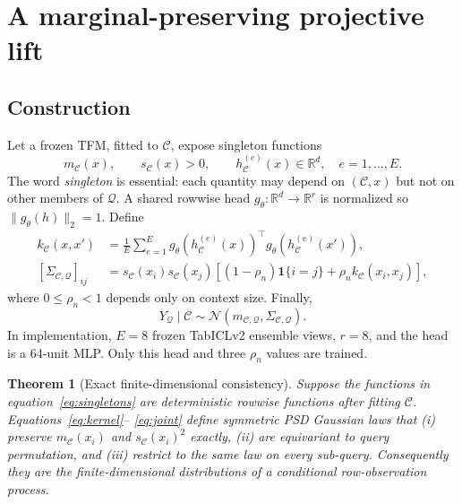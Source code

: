 \documentclass{article}
\newtheorem{theorem}{Theorem}
\newcommand{\context}{\mathcal{C}}
\newcommand{\query}{\mathcal{Q}}
\newcommand{\RR}{\mathbb{R}}
\begin{document}
\section{A marginal-preserving projective lift}

\subsection{Construction}

Let a frozen TFM, fitted to $\context$, expose singleton functions
\begin{equation}
 m_\context(x),\qquad s_\context(x)>0,\qquad
 h_\context^{(e)}(x)\in\RR^d,\quad e=1,\ldots,E.       \label{eq:singletons}
\end{equation}
The word \emph{singleton} is essential: each quantity may depend on
$(\context,x)$ but not on other members of $\query$.  A shared rowwise head
$g_\theta:\RR^d\to\RR^r$ is normalized so
$\|g_\theta(h)\|_2=1$.  Define
\begin{align}
 k_\context(x,x')
 &=\frac1E\sum_{e=1}^E
 g_\theta(h_\context^{(e)}(x))^\top
 g_\theta(h_\context^{(e)}(x')),                                      \label{eq:kernel}\\
 [\Sigma_{\context,\query}]_{ij}
 &=s_\context(x_i)s_\context(x_j)
 \left[(1-\rho_n)\mathbf{1}\{i=j\}+\rho_n k_\context(x_i,x_j)\right], \label{eq:cov}
\end{align}
where $0\leq\rho_n<1$ depends only on context size.  Finally,
\begin{equation}
 Y_\query\mid\context\sim
 \mathcal{N}\!\left(m_{\context,\query},\Sigma_{\context,\query}\right).
                                                                    \label{eq:joint}
\end{equation}
In implementation, $E=8$ frozen TabICLv2 ensemble views, $r=8$, and the head
is a 64-unit MLP.  Only this head and three $\rho_n$ values are trained.

\begin{theorem}[Exact finite-dimensional consistency]\label{thm:process}
Suppose the functions in equation~\eqref{eq:singletons} are deterministic
rowwise functions after fitting $\context$.  Equations~\eqref{eq:kernel}--
\eqref{eq:joint} define symmetric PSD Gaussian laws that (i) preserve
$m_\context(x_i)$ and $s_\context(x_i)^2$ exactly, (ii) are equivariant to
query permutation, and (iii) restrict to the same law on every sub-query.
Consequently they are the finite-dimensional distributions of a conditional
row-observation process.
\end{theorem}
\end{document}
